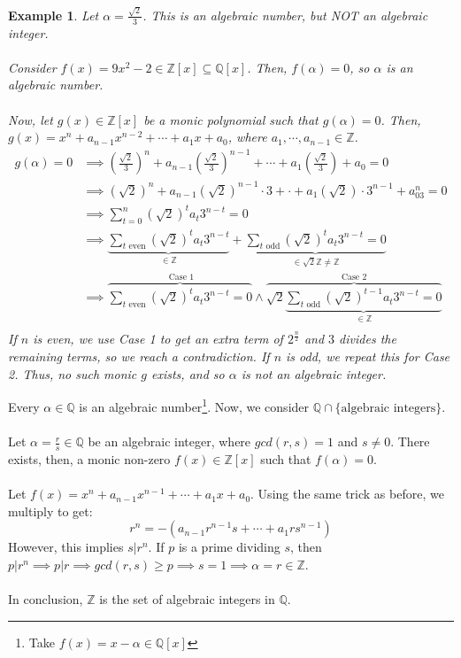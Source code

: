 \documentclass{article}
\newcommand{\Q}{\mathbb{Q}}
\newcommand{\Z}{\mathbb{Z}}
\newtheorem{example}{Example}[subsection]
\begin{document}
\begin{example}
Let $\alpha=\frac{\sqrt{2}}{3}$. This is an algebraic number, but NOT an algebraic integer.\\
\\
Consider $f(x)=9x^2-2\in \Z[x]\subseteq \Q[x]$. Then, $f(\alpha)=0$, so $\alpha$ is an algebraic number.\\
\\
Now, let $g(x)\in \Z[x]$ be a monic polynomial such that $g(\alpha)=0$. Then, $g(x)=x^n+a_{n-1}x^{n-2}+\cdots +a_1x + a_0$, where $a_1,\cdots, a_{n-1}\in\Z$.
\begin{align*}
    g(\alpha)=0&\implies \left(\frac{\sqrt{2}}{3}\right)^n + a_{n-1}\left(\frac{\sqrt{2}}{3}\right)^{n-1}+\cdots + a_1\left(\frac{\sqrt{2}}{3}\right)+a_0=0\\
    &\implies (\sqrt{2})^n + a_{n-1}(\sqrt{2})^{n-1}\cdot 3+\cdot + a_1(\sqrt{2})\cdot 3^{n-1} + a_03^n = 0\\
    &\implies \displaystyle\sum_{t=0}^n (\sqrt{2})^ta_t3^{n-t}=0\\
    &\implies \underbrace{\displaystyle\sum_{t\text{ even}} (\sqrt{2})^ta_t3^{n-t}}_{\in\Z} + \underbrace{\displaystyle\sum_{t\text{ odd}} (\sqrt{2})^ta_t3^{n-t}=0}_{\in\sqrt{2}\Z\neq \Z}\\
    &\implies \overbrace{\displaystyle\sum_{t\text{ even}} (\sqrt{2})^ta_t3^{n-t}=0}^{\text{ Case 1}} \wedge \overbrace{\displaystyle \sqrt{2}\underbrace{\sum_{t\text{ odd}} (\sqrt{2})^{t-1}a_t3^{n-t}=0}_{\in\Z}}^{\text{Case 2}}\\
\end{align*}
If $n$ is even, we use Case 1 to get an extra term of $2^{\frac{n}{2}}$ and $3$ divides the remaining terms, so we reach a contradiction. If $n$ is odd, we repeat this for Case 2. Thus, no such monic $g$ exists, and so $\alpha$ is not an algebraic integer.
\end{example}
\noindent Every $\alpha\in\Q$ is an algebraic number\footnote{Take $f(x)=x-\alpha\in\Q[x]$}. Now, we consider $\Q\cap \{\text{algebraic integers}\}$.\\
\\
Let $\alpha=\frac{r}{s}\in\Q$ be an algebraic integer, where $gcd(r,s)=1$ and $s\neq 0$. There exists, then, a monic non-zero $f(x)\in\Z[x]$ such that $f(\alpha)=0$.\\
\\
Let $f(x)=x^n+a_{n-1}x^{n-1}+\cdots +a_1x+a_0$. Using the same trick as before, we multiply to get:
$$r^n=-(a_{n-1}r^{n-1}s+\cdots +a_1rs^{n-1})$$
However, this implies $s|r^n$. If $p$ is a prime dividing $s$, then $p|r^n\implies p|r\implies gcd(r,s)\geq p\implies s=1\implies \alpha=r\in\Z$.\\
\\
In conclusion, $\Z$ is the set of algebraic integers in $\Q$.
\end{document}
